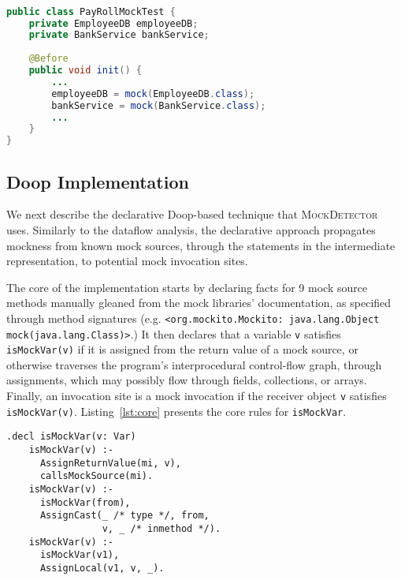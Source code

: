 \begin{lstlisting}[basicstyle=\ttfamily, caption={Example for field mocks defined in Before method from \texttt{PayRollMockTest.java} in microbenchmark.},
basicstyle=\scriptsize\ttfamily,language = Java, framesep=4.5mm,
framexleftmargin=1mm, captionpos=b, xleftmargin=3.5ex, label=lis:fieldMock2]

public class PayRollMockTest {
	private EmployeeDB employeeDB;
	private BankService bankService;
	
	@Before
	public void init() {
		...
		employeeDB = mock(EmployeeDB.class);
		bankService = mock(BankService.class);
		...
	}
}

\end{lstlisting}

\subsection{Doop Implementation}
We next describe the declarative Doop-based technique that \textsc{MockDetector} uses. Similarly to the dataflow analysis, the declarative approach propagates mockness from known mock sources, through the statements in the intermediate representation, to potential mock invocation sites.

The core of the implementation starts by declaring facts for 9 mock source methods manually gleaned from the mock libraries' documentation, as specified through method signatures (e.g. 
\texttt{<org.mockito.Mockito: java.lang.Object mock(java.lang.Class)>}.)
It then declares that a variable {\tt v} satisfies \verb+isMockVar(v)+ if it is assigned from the return value of a mock source, or otherwise traverses the program's interprocedural control-flow graph, through assignments, which may possibly flow through fields, collections, or arrays. Finally, an invocation site is a mock invocation if the receiver object {\tt v} satisfies \verb+isMockVar(v)+. Listing~\ref{lst:core} presents the core rules for {\tt isMockVar}.

\begin{lstlisting}[basicstyle=\ttfamily\small,numbers=none,label={lst:core},caption={Core rules for propagating mockness via predicate {\tt isMockVar}.}]
    .decl isMockVar(v: Var)
    isMockVar(v) :-
      AssignReturnValue(mi, v),
      callsMockSource(mi).
    isMockVar(v) :-
      isMockVar(from),
      AssignCast(_ /* type */, from, 
                 v, _ /* inmethod */).
    isMockVar(v) :-
      isMockVar(v1),
      AssignLocal(v1, v, _).
\end{lstlisting}

